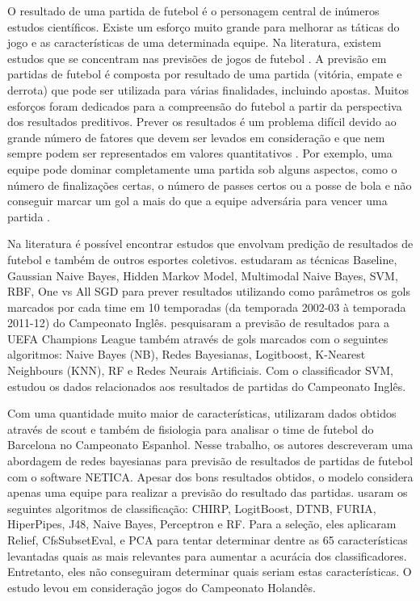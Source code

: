 O resultado de uma partida de futebol é o personagem central de inúmeros estudos científicos. Existe um esforço muito grande para melhorar as táticas do jogo e as características de uma determinada equipe. Na literatura, existem estudos que se concentram nas previsões de jogos de futebol \cite{Constantinou2013}. A previsão em partidas de futebol é composta por resultado de uma partida (vitória, empate e derrota) que pode  ser  utilizada para várias finalidades, incluindo apostas. Muitos esforços foram dedicados para a compreensão do futebol a partir da perspectiva dos resultados preditivos. Prever os resultados é um problema difícil devido ao grande número de fatores que devem ser levados em consideração e que nem sempre podem ser representados em valores quantitativos \cite{Hucaljuk2011}. Por exemplo, uma equipe pode dominar completamente uma partida sob alguns aspectos, como o número de finalizações certas, o número de passes certos ou a posse de bola e não conseguir marcar um gol a mais do que a equipe adversária para vencer uma partida \cite{Brooks2016}.

Na literatura é possível encontrar estudos que envolvam predição de resultados de futebol e também de outros esportes coletivos.  estudaram as técnicas Baseline, Gaussian Naive Bayes, Hidden Markov Model, Multimodal Naive Bayes, SVM, RBF, One vs All SGD para prever resultados utilizando como parâmetros os gols marcados por cada time em 10 temporadas (da temporada 2002-03 à temporada 2011-12) do Campeonato Inglês.  pesquisaram a previsão de resultados para a UEFA Champions League também através de gols marcados com o seguintes algoritmos: Naive Bayes (NB), Redes Bayesianas, Logitboost, K-Nearest Neighbours (KNN), RF e Redes Neurais Artificiais. Com o classificador SVM,  estudou os dados relacionados aos resultados de partidas do Campeonato Inglês.

Com uma quantidade muito maior de características,  utilizaram dados obtidos através de scout e também de fisiologia para analisar o time de futebol do Barcelona no Campeonato Espanhol. Nesse trabalho, os autores descreveram uma abordagem de redes bayesianas para previsão de resultados de partidas de futebol com o software NETICA. Apesar dos bons resultados obtidos, o modelo considera apenas uma equipe para realizar a previsão do resultado das partidas.  usaram os seguintes algoritmos de classificação: CHIRP, LogitBoost, DTNB, FURIA, HiperPipes, J48, Naive Bayes, Perceptron e RF. Para a seleção, eles aplicaram Relief, CfsSubsetEval, e PCA para tentar determinar dentre as 65 características levantadas quais as mais relevantes para aumentar a acurácia dos classificadores. Entretanto, eles não conseguiram determinar quais seriam estas características. O estudo levou em consideração jogos do Campeonato Holandês.

